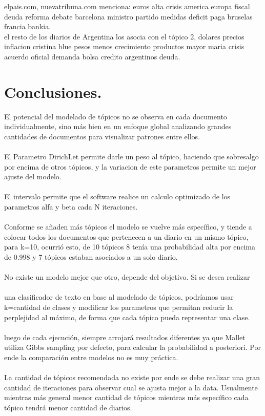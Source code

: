 \documentclass[8.5pt,twoside,twocolumn]{article}
\begin{document}
 elpais.com, nuevatribuna.com menciona: euros alta crisis america europa fiscal 
deuda reforma  debate barcelona ministro partido 
medidas deficit paga bruselas francia bankia.
\\
el resto de los diarios de Argentina los asocia con el t\'opico 2, dolares precios 
inflacion cristina blue pesos menos crecimiento productos mayor maria 
crisis acuerdo oficial demanda bolsa credito argentinos deuda.


\section{Conclusiones.}
El potencial del modelado de t\'opicos no se observa en cada 
documento individualmente, sino m\'as bien en un enfoque global analizando 
grandes cantidades de documentos para visualizar patrones entre ellos. 
\\
\\
El Parametro DirichLet permite darle un peso al t\'opico, haciendo 
que sobresalgo por encima de otros t\'opicos, y la variacion de este 
parametros permite un mejor ajuste del modelo.
\\
\\
El intervalo permite que el software realice un calculo optimizado de los parametros alfa y beta cada N iteraciones.
\\
\\
Conforme se a\~naden m\'as t\'opicos el modelo se vuelve m\'as espec\'ifico, y tiende a colocar todos los documentos que pertenecen a un diario en un mismo t\'opico, para k=10, ocurri\'o esto, de 10 t\'opicos 8 ten\'ia una probabilidad alta por encima de 0.998 y 7 t\'opicos estaban asociados a un solo diario.
\\
\\
No existe un modelo mejor que otro, depende del objetivo. Si se desea realizar
\\
\\
 una clasificador de texto en base al modelado de t\'opicos, 
podr\'iamos usar k=cantidad de clases y modificar los parametros que permitan 
reducir la perplejidad al m\'aximo, de forma que cada t\'opico pueda representar una clase.
\\
\\
luego de cada ejecuci\'on, siempre arrojar\'a resultados diferentes ya que Mallet utiliza Gibbs sampling por defecto, para calcular la probabilidad a posteriori. Por ende la comparaci\'on entre modelos no es muy pr\'actica.
\\
\\
La cantidad de t\'opicos recomendada no existe por ende se debe realizar una gran cantidad de iteraciones para observar cual se ajusta mejor a la data. Usualmente mientras m\'as general menor cantidad de t\'opicos mientras m\'as espec\'ifico cada t\'opico tendr\'a menor cantidad de diarios.
\end{document}
